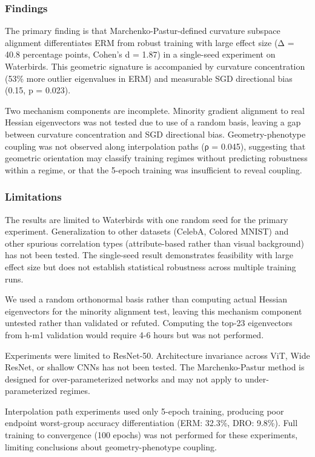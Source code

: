 
\subsubsection{Findings}

The primary finding is that Marchenko-Pastur-defined curvature subspace alignment differentiates ERM from robust training with large effect size (Δ = 40.8 percentage points, Cohen's d = 1.87) in a single-seed experiment on Waterbirds. This geometric signature is accompanied by curvature concentration (53\% more outlier eigenvalues in ERM) and measurable SGD directional bias (0.15, p = 0.023).

Two mechanism components are incomplete. Minority gradient alignment to real Hessian eigenvectors was not tested due to use of a random basis, leaving a gap between curvature concentration and SGD directional bias. Geometry-phenotype coupling was not observed along interpolation paths (ρ = 0.045), suggesting that geometric orientation may classify training regimes without predicting robustness within a regime, or that the 5-epoch training was insufficient to reveal coupling.

\subsubsection{Limitations}

The results are limited to Waterbirds with one random seed for the primary experiment. Generalization to other datasets (CelebA, Colored MNIST) and other spurious correlation types (attribute-based rather than visual background) has not been tested. The single-seed result demonstrates feasibility with large effect size but does not establish statistical robustness across multiple training runs.

We used a random orthonormal basis rather than computing actual Hessian eigenvectors for the minority alignment test, leaving this mechanism component untested rather than validated or refuted. Computing the top-23 eigenvectors from h-m1 validation would require 4-6 hours but was not performed.

Experiments were limited to ResNet-50. Architecture invariance across ViT, Wide ResNet, or shallow CNNs has not been tested. The Marchenko-Pastur method is designed for over-parameterized networks and may not apply to under-parameterized regimes.

Interpolation path experiments used only 5-epoch training, producing poor endpoint worst-group accuracy differentiation (ERM: 32.3\%, DRO: 9.8\%). Full training to convergence (100 epochs) was not performed for these experiments, limiting conclusions about geometry-phenotype coupling.

